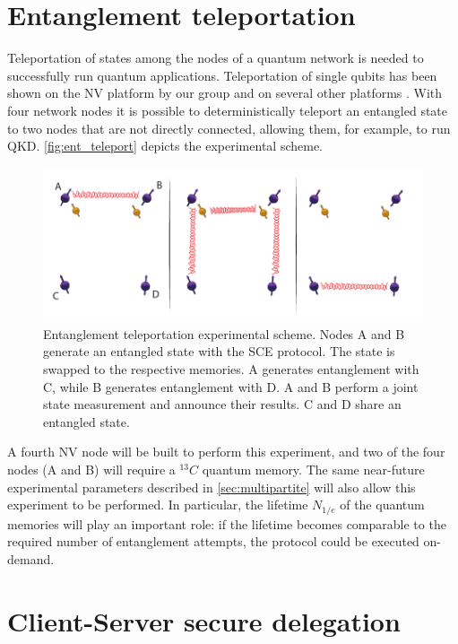 \documentclass[a4paper]{article}
\begin{document}
\section{Entanglement teleportation}
\label{sec:teleportation}
Teleportation of states among the nodes of a quantum network is needed to successfully run quantum applications. Teleportation of single qubits has been shown on the \ac{NV} platform by our group \cite{Pfaff2014} and on several other platforms \cite{Takeda2013, Wang2015, Valivarthi2016}.
With four network nodes it is possible to deterministically teleport an entangled state to two nodes that are not directly connected, allowing them, for example, to run \ac{QKD}. \autoref{fig:ent_teleport} depicts the experimental scheme. 

\begin{figure}
	\includegraphics[width=\textwidth]{images/figure5}
	\caption{Entanglement teleportation experimental scheme. Nodes A and B generate an entangled state with the \ac{SCE} protocol. The state is swapped to the respective memories. A generates entanglement with C, while B generates entanglement with D. A and B perform a joint state measurement and announce their results. C and D share an entangled state. }
	\label{fig:ent_teleport}
\end{figure}

A fourth \ac{NV} node will be built to perform this experiment, and two of the four nodes (A and B) will require a ${}^{13}C$ quantum memory. The same near-future experimental parameters described in \autoref{sec:multipartite} will also allow this experiment to be performed. In particular, the lifetime $N_{1/e}$ of the quantum memories will play an important role: if the lifetime becomes comparable to the required number of entanglement attempts, the protocol could be executed on-demand. 

\section{Client-Server secure delegation}
\label{sec:delegation}
\end{document}
